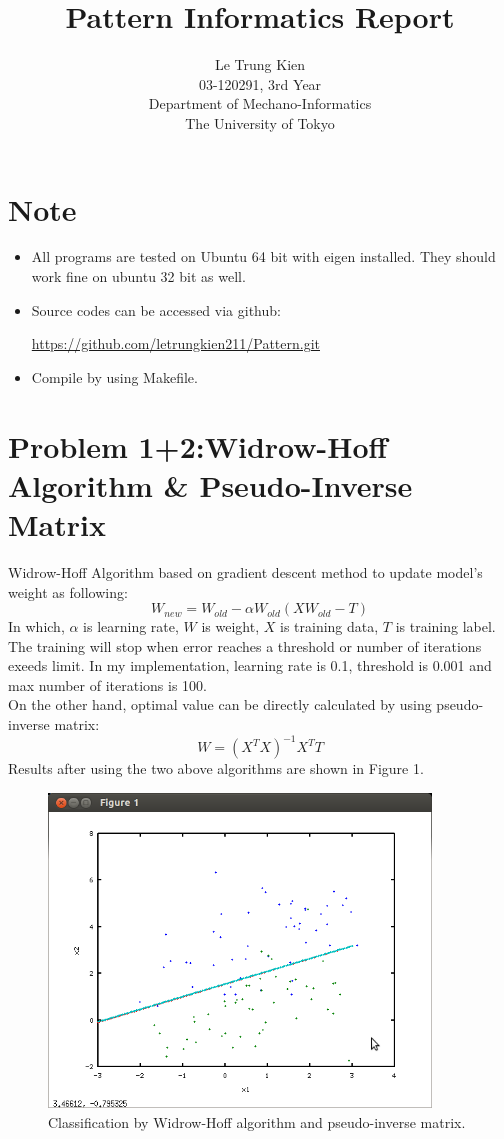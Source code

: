 \documentclass[a4paper, 11pt]{article}
\begin{document}
\title{Pattern Informatics Report}
\author{Le Trung Kien\\ 
  03-120291, 3rd Year \\
  Department of Mechano-Informatics \\ 
  The University of Tokyo
}
\maketitle

\section*{Note}
\begin{itemize}
\item All programs are tested on Ubuntu 64 bit with eigen installed. They should work fine on ubuntu 32 bit as well.
\item Source codes can be accessed via github: 
  \begin{center}\url{https://github.com/letrungkien211/Pattern.git} \end{center}
\item Compile by using Makefile.
\end{itemize}
\section*{Problem 1+2:Widrow-Hoff Algorithm \& Pseudo-Inverse Matrix}
Widrow-Hoff Algorithm based on gradient descent method to update model's weight as following:
\[ W_{new} = W_{old} - \alpha W_{old} (X W_{old} - T)\]
In which, $\alpha$ is learning rate, $W$ is weight, $X$ is training data, $T$ is training label. The training will stop when error reaches a threshold or number of iterations exeeds limit. In my implementation, learning rate is 0.1, threshold is 0.001 and max number of iterations is 100. \\
On the other hand, optimal value can be directly calculated by using pseudo-inverse matrix:
\[ W = (X^{T}X)^{-1}X^TT\]
Results after using the two above algorithms are shown in Figure 1.
\begin{figure}[hbt]
  \centering
  \includegraphics[width=4in]{1-2.png}
  \caption[Close up of \textit{Hemidactylus} sp.]
  {Classification by Widrow-Hoff algorithm and pseudo-inverse matrix.}
\end{figure}
\end{document}
